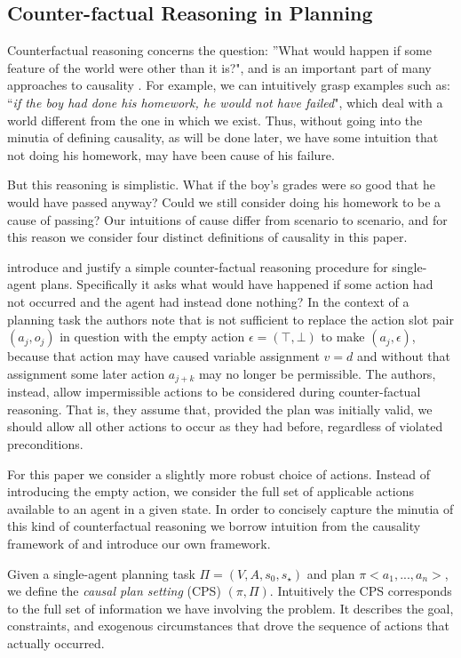 \documentclass{article}
\theoremstyle{plain}
\theoremstyle{definition}
\begin{document}
\subsection{Counter-factual Reasoning in Planning} \label{sec:counterfactualPlanning}

Counterfactual reasoning concerns the question: ''What would happen if some feature of the world were other than it is?", and is an important part of many approaches to causality \citep{halpern2005causes}. For example, we can intuitively grasp examples such as: ``\textit{if the boy had done his homework, he would not have failed}", which deal with a world different from the one in which we exist. Thus, without going into the minutia of defining causality, as will be done later, we have some intuition that not doing his homework, may have been cause of his failure.

But this reasoning is simplistic. What if the boy's grades were so good that he would have passed anyway? Could we still consider doing his homework to be a cause of passing? Our intuitions of cause differ from scenario to scenario, and for this reason we consider four distinct definitions of causality in this paper.

\cite{lind2019ethical} introduce and justify a simple counter-factual reasoning procedure for single-agent plans. Specifically it asks what would have happened if some action had not occurred and the agent had instead done nothing? In the context of a planning task the authors note that is not sufficient to replace the action slot pair $(a_j, o_j)$ in question with the empty action $\epsilon=(\top, \bot)$ to make $(a_j, \epsilon)$, because that action may have caused variable assignment $v=d$ and without that assignment some later action $a_{j+k}$ may no longer be permissible. The authors, instead, allow impermissible actions to be considered during counter-factual reasoning. That is, they assume that, provided the plan was initially valid, we should allow all other actions to occur as they had before, regardless of violated preconditions.

For this paper we consider a slightly more robust choice of actions. Instead of introducing the empty action, we consider the full set of applicable actions available to an agent in a given state. In order to concisely capture the minutia of this kind of counterfactual reasoning we borrow intuition from the causality framework of \cite{halpern2005causes} and introduce our own framework.

Given a single-agent planning task $\Pi=(V, A, s_0, s_\star)$ and plan $\pi<a_1,...,a_n>$, we define the \textit{causal plan setting} (CPS) $(\pi,\Pi)$. Intuitively the CPS corresponds to the full set of information we have involving the problem. It describes the goal, constraints, and exogenous circumstances that drove the sequence of actions that actually occurred.
\end{document}
